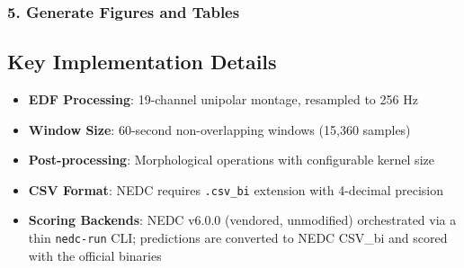 \begin{Shaded}
\begin{Highlighting}[]
 \KeywordTok{\textbackslash{}}
  \KeywordTok{\textbackslash{}}
  \KeywordTok{\textbackslash{}}
\end{Highlighting}
\end{Shaded}

\hypertarget{generate-figures-and-tables}{%
\subsubsection{5. Generate Figures and
Tables}\label{generate-figures-and-tables}}

\begin{Shaded}
\begin{Highlighting}[]
\end{Highlighting}
\end{Shaded}

\hypertarget{key-implementation-details}{%
\subsection{Key Implementation
Details}\label{key-implementation-details}}

\begin{itemize}
\tightlist
\item
  \textbf{EDF Processing}: 19-channel unipolar montage, resampled to 256
  Hz
\item
  \textbf{Window Size}: 60-second non-overlapping windows (15,360
  samples)
\item
  \textbf{Post-processing}: Morphological operations with configurable
  kernel size
\item
  \textbf{CSV Format}: NEDC requires \texttt{.csv\_bi} extension with
  4-decimal precision
\item
  \textbf{Scoring Backends}: NEDC v6.0.0 (vendored, unmodified)
  orchestrated via a thin \texttt{nedc-run} CLI; predictions are
  converted to NEDC CSV\_bi and scored with the official binaries
\end{itemize}

